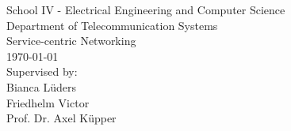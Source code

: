 \begin{titlepage}
\begin{center}
		School IV - Electrical Engineering and Computer Science\\
		Department of Telecommunication Systems\\
		Service-centric Networking\\
		\vspace{0.5cm}
		\vspace{2.2cm}
		\today\\
		\vspace{2.0cm}
		\large
		Supervised by:\\
		Bianca Lüders\\
		Friedhelm Victor\\
		Prof. Dr. Axel Küpper\\
		\end{center}
\end{titlepage}
